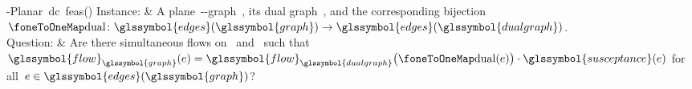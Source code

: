 \begin{problem}[framed]{\source-\sink Planar~\gls{dc}~\gls{feas}()
 }%
  Instance: & A plane~\source-\sink-graph~, its
  dual graph~, and the corresponding
  bijection~$\oneToOneMap\colon \glssymbol{edges}(\glssymbol{graph}) \to
  \glssymbol{edges}(\glssymbol{dualgraph})$.
  \\
  Question: & Are there simultaneous flows on~
  and~ such that~$
  \glssymbol{flow}_{\glssymbol{graph}}(\edge) 
  = 
  \glssymbol{flow}_{\glssymbol{dualgraph}}
  \big(
    \oneToOneMap(\edge)
  \big)
  \cdot
  \glssymbol{susceptance}(\edge)
  $ for all~$\edge\in\glssymbol{edges}(\glssymbol{graph})$?
\end{problem}%